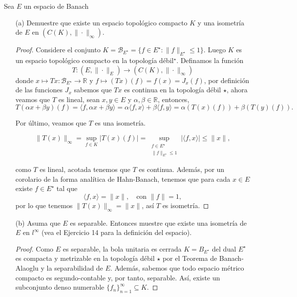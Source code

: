  Sea $E$ un espacio de Banach
 \begin{itemize}
     \item[(a)] Demuestre que existe un espacio topológico compacto $K$ y una isometría de $E$ en $\left(C(K),\|\cdot\|_{\infty}\right)$.
     \begin{proof}
         Considere el conjunto $K=\mathcal{B}_{E^{\star}}=\{f \in E^{\star}:\|f\|_{E^{\star}}\leq 1\}$. Luego $K$ es un espacio topológico compacto en la topología débil$^{\star}$. Definamos la función $$T \colon (E, \|\cdot\|_E) \to(C(K), \|\cdot\|_\infty)$$ donde $x \mapsto Tx \colon \mathcal{B}_{E^{\star}} \to \mathbb{R}$
y $f \mapsto (Tx)(f) =f(x)=J_x(f)$, por definición de las funciones $J_x$ sabemos que $Tx$ es continua en la topología débil $\star$, ahora veamos que $T$ es lineal, sean $x, y \in E$ y $\alpha, \beta \in \mathbb{R}$, entonces,
\[
T(\alpha x + \beta y)(f) = \langle f, \alpha x + \beta y \rangle = \alpha \langle f, x \rangle + \beta \langle f, y \rangle = \alpha (T(x)(f)) + \beta (T(y)(f)).
\]

Por último, veamos que $T$ es una isometría.

\[
\|T(x)\|_\infty = \sup_{f \in K} |T(x)(f)| = \sup_{\substack{f \in E^{\star} \\ \|f\|_{E^{\star}} \leq 1}} |\langle f, x \rangle|\leq \|x\|,
\]

como $T$ es lineal, acotada tenemos que $T$ es continua. Además, por un corolario de la forma analítica de Hahn-Banach, tenemos que para cada $x \in E$ existe $f \in E^{\star}$ tal que
\[
\langle f, x \rangle = \|x\|, \quad \text{con } \|f\| = 1,
\]
por lo que tenemos $\|T(x)\|_\infty = \|x\|$, así $T$ es isometría.

     \end{proof}




     \item[(b)] Asuma que $E$ es separable. Entonces muestre que existe una isometría de $E$ en $l^{\infty}$ (vea el Ejercicio 14 para la definición del espacio).
     \begin{proof}
         
    
Como \( E \) es separable, la bola unitaria es cerrada \( K = B_{E^{\star}} \) del dual \( E^{\star} \) es compacta y metrizable en la topología débil \(\star\) por el Teorema de Banach-Alaoglu y la separabilidad de \( E \). Además, sabemos que todo espacio métrico compacto es segundo-contable y, por tanto, separable. Así, existe un subconjunto denso numerable \( \{f_n\}_{n=1}^\infty \subseteq K \).


\end{proof}
\end{itemize}

